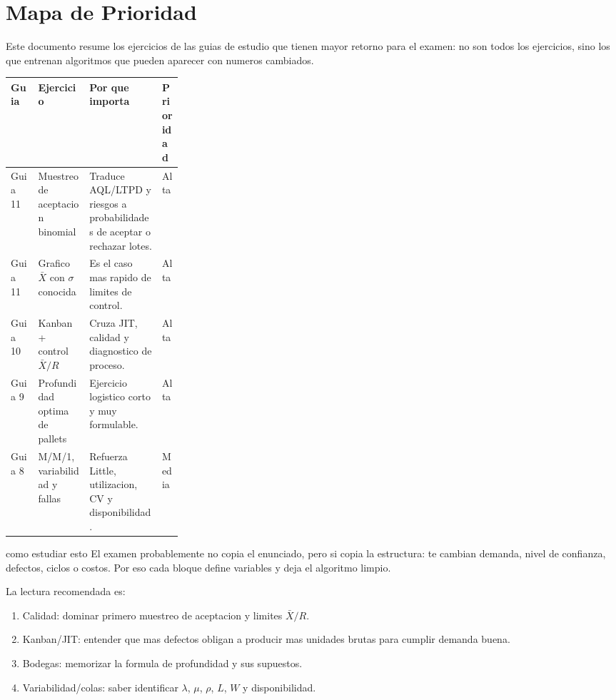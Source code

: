 \section{Mapa de Prioridad}

Este documento resume los ejercicios de las guias de estudio que tienen mayor retorno para el examen: no son todos los ejercicios, sino los que entrenan algoritmos que pueden aparecer con numeros cambiados.

\begin{center}
\begin{tabularx}{\linewidth}{p{0.16\linewidth}X X p{0.12\linewidth}}
\toprule
Guia & Ejercicio & Por que importa & Prioridad \\
\midrule
Guia 11 & Muestreo de aceptacion binomial & Traduce AQL/LTPD y riesgos a probabilidades de aceptar o rechazar lotes. & Alta \\
Guia 11 & Grafico $\bar X$ con $\sigma$ conocida & Es el caso mas rapido de limites de control. & Alta \\
Guia 10 & Kanban + control $\bar X/R$ & Cruza JIT, calidad y diagnostico de proceso. & Alta \\
Guia 9 & Profundidad optima de pallets & Ejercicio logistico corto y muy formulable. & Alta \\
Guia 8 & M/M/1, variabilidad y fallas & Refuerza Little, utilizacion, CV y disponibilidad. & Media \\
\bottomrule
\end{tabularx}
\end{center}

\begin{alerta}{como estudiar esto}
El examen probablemente no copia el enunciado, pero si copia la estructura: te cambian demanda, nivel de confianza, defectos, ciclos o costos. Por eso cada bloque define variables y deja el algoritmo limpio.
\end{alerta}

La lectura recomendada es:
\begin{enumerate}
  \item Calidad: dominar primero muestreo de aceptacion y limites $\bar X/R$.
  \item Kanban/JIT: entender que mas defectos obligan a producir mas unidades brutas para cumplir demanda buena.
  \item Bodegas: memorizar la formula de profundidad y sus supuestos.
  \item Variabilidad/colas: saber identificar $\lambda$, $\mu$, $\rho$, $L$, $W$ y disponibilidad.
\end{enumerate}
